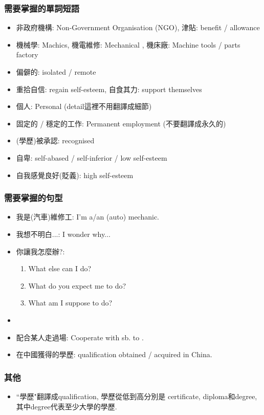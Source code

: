 \subsubsection*{需要掌握的單詞短語}
\begin{itemize}
  \itemsep0em
  \item 非政府機構: Non-Government Organisation (NGO), 津貼: benefit / allowance
  \item 機械學: Machics, 機電維修: Mechanical , 機床廠: Machine tools / parts factory
  \item 偏僻的: isolated / remote
  \item 重拾自信: regain self-esteem, 自食其力: support themselves
  \item 個人: Personal  (detail這裡不用翻譯成細節)
  \item 固定的 / 穩定的工作: Permanent employment (不要翻譯成永久的)
  \item (學歷)被承認: recognised
  \item 自卑: self-abased / self-inferior / low self-esteem
  \item 自我感覺良好(貶義): high self-esteem
\end{itemize}

\subsubsection*{需要掌握的句型}
\begin{itemize}
  \itemsep0em
  \item 我是(汽車)維修工: I'm a/an (auto) mechanic.
  \item 我想不明白...: I wonder why...
  \item 你讓我怎麼辦?:
  \begin{enumerate}
    \itemsep0em
    \item What else can I do?
    \item What do you expect me to do?
    \item What am I suppose to do?
  \end{enumerate}
  \item {}
  \item 配合某人走過場: Cooperate with sb. to .
  \item 在中國獲得的學歷: qualification obtained / acquired in China.
\end{itemize}

\subsubsection*{其他}
\begin{itemize}
  \itemsep0em
  \item ``學歷"翻譯成qualification, 學歷從低到高分別是 certificate, diploma和degree, 其中degree代表至少大學的學歷.
\end{itemize}

